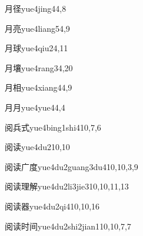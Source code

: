 \begin{entry}{月径}{yue4jing4}{4,8}
\end{entry}

\begin{entry}{月亮}{yue4liang5}{4,9}
\end{entry}

\begin{entry}{月球}{yue4qiu2}{4,11}
\end{entry}

\begin{entry}{月壤}{yue4rang3}{4,20}
\end{entry}

\begin{entry}{月相}{yue4xiang4}{4,9}
\end{entry}

\begin{entry}{月月}{yue4yue4}{4,4}
\end{entry}

\begin{entry}{阅兵式}{yue4bing1shi4}{10,7,6}
\end{entry}

\begin{entry}{阅读}{yue4du2}{10,10}
\end{entry}

\begin{entry}{阅读广度}{yue4du2guang3du4}{10,10,3,9}
\end{entry}

\begin{entry}{阅读理解}{yue4du2li3jie3}{10,10,11,13}
\end{entry}

\begin{entry}{阅读器}{yue4du2qi4}{10,10,16}
\end{entry}

\begin{entry}{阅读时间}{yue4du2shi2jian1}{10,10,7,7}
\end{entry}

